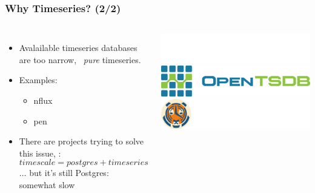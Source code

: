 \documentclass[mathserif,usenames,dvipsnames]{beamer}
\begin{document}
\begin{frame}
\frametitle{Why Timeseries? (2/2)}
\begin{columns}[T]
\begin{itemize}
\item Avalailable timeseries databases are too narrow, 
      \ie\ \emph{pure} timeseries.
\item Examples:
      \begin{itemize}
      \item {}nflux
      \item {}pen
      \end{itemize}
\item There are projects trying to solve this issue,
      \eg: \[
      timescale = postgres + timeseries\]
      $\dots$ but it's still Postgres: somewhat slow
\end{itemize}
\vskip1.0cm
\includegraphics[width=0.7\linewidth]{influxlogo.png}\\[12pt]
\includegraphics[width=0.8\linewidth]{tsdblogo.png}\\[12pt]
\vskip0.5cm
\includegraphics[width=0.8\linewidth]{timescalelogo.png}
\end{columns}
\end{frame}
\end{document}
